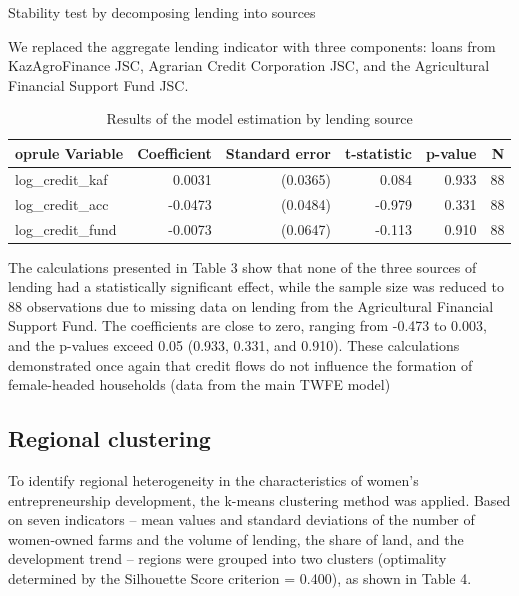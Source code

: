 ﻿\documentclass[pdflatex,sn-mathphys-ay]{sn-jnl}
\begin{document}
Stability test by decomposing lending into sources

We replaced the aggregate lending indicator with three components: loans
from KazAgroFinance JSC, Agrarian Credit Corporation JSC, and the
Agricultural Financial Support Fund JSC.

\begin{table}[htbp]
\caption{Results of the model estimation by lending source}\label{tab:lending-source}%
\small
\begin{tabular*}{\textwidth}{@{\extracolsep{\fill}}p{}rrrrr@{}}
	oprule
Variable & Coefficient & Standard error & t-statistic & p-value & N\\
\midrule
log\_credit\_kaf & 0.0031 & (0.0365) & 0.084 & 0.933 & 88\\
log\_credit\_acc & -0.0473 & (0.0484) & -0.979 & 0.331 & 88\\
log\_credit\_fund & -0.0073 & (0.0647) & -0.113 & 0.910 & 88\\
\bottomrule
\end{tabular*}
\end{table}

The calculations presented in Table 3 show that none of the three
sources of lending had a statistically significant effect, while the
sample size was reduced to 88 observations due to missing data on
lending from the Agricultural Financial Support Fund. The coefficients
are close to zero, ranging from -0.473 to 0.003, and the p-values exceed
0.05 (0.933, 0.331, and 0.910). These calculations demonstrated once
again that credit flows do not influence the formation of female-headed
households (data from the main TWFE model)

\subsection{Regional clustering}

To identify regional heterogeneity in the characteristics of women's
entrepreneurship development, the k-means clustering method was applied.
Based on seven indicators -- mean values and standard deviations of the
number of women-owned farms and the volume of lending, the share of
land, and the development trend -- regions were grouped into two
clusters (optimality determined by the Silhouette Score criterion =
0.400), as shown in Table 4.
\end{document}
